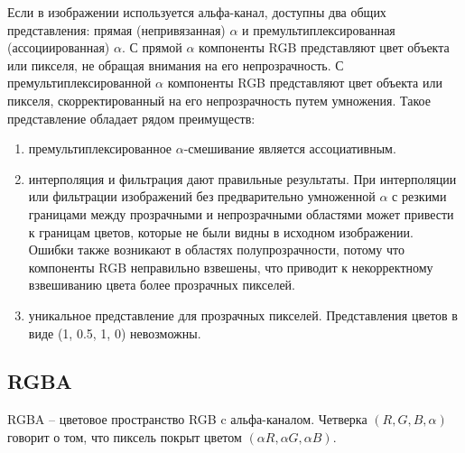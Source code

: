 Если в изображении используется альфа-канал, доступны два общих представления: прямая (непривязанная) $\alpha$ и премультиплексированная (ассоциированная) $\alpha$. С прямой $\alpha$ компоненты RGB представляют цвет объекта или пикселя, не обращая внимания на его непрозрачность. С премультиплексированной $\alpha$ компоненты RGB представляют цвет объекта или пикселя, скорректированный на его непрозрачность путем умножения. Такое представление обладает рядом преимуществ: 
\begin{enumerate}
	\item премультиплексированное $\alpha$-смешивание является ассоциативным.
	\item интерполяция и фильтрация дают правильные результаты. При интерполяции или фильтрации изображений без предварительно умноженной $\alpha$ с резкими границами между прозрачными и непрозрачными областями  может привести к границам цветов, которые не были видны в исходном изображении. Ошибки также возникают в областях полупрозрачности, потому что компоненты RGB неправильно взвешены, что приводит к некорректному взвешиванию цвета более прозрачных пикселей.
	\item уникальное представление для прозрачных пикселей. Представления цветов в виде (1, 0.5, 1, 0) невозможны.
\end{enumerate}


\subsection{RGBA}
RGBA -- цветовое пространство RGB c альфа-каналом. Четверка $(R, G, B, \alpha)$ говорит о том, что пиксель покрыт цветом $(\alpha R, \alpha G, \alpha B)$. 

\begin{figure}[ht!]
\end{figure}

